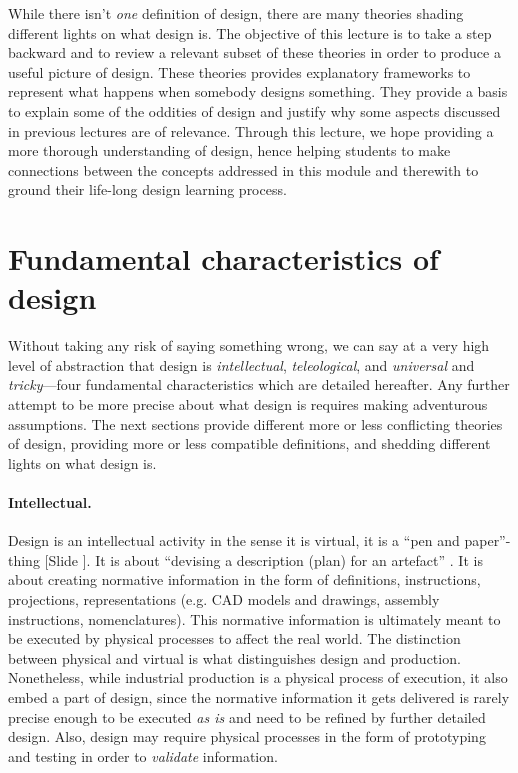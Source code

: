 \documentclass{article}
\newcounter{slide}
\begin{document}
While there isn't \emph{one} definition of design, there are many theories shading different lights on what design is. The objective of this lecture is to take a step backward and to review a relevant subset of these theories in order to produce a useful picture of design. These theories provides explanatory frameworks to represent what happens when somebody designs something. They provide a basis to explain some of the oddities of design and justify why some aspects discussed in previous lectures are of relevance. Through this lecture, we hope providing a more thorough understanding of design, hence helping students to make connections between the concepts addressed in this module and therewith to ground their life-long design learning process.

\section{Fundamental characteristics of design}
\label{sec:whatisdesign}

Without taking any risk of saying something wrong, we can say at a very high level of abstraction that design is \emph{intellectual}, \emph{teleological}, and \emph{universal} and \emph{tricky}---four fundamental characteristics which are detailed hereafter. Any further attempt to be more precise about what design is requires making adventurous assumptions. The next sections provide different more or less conflicting theories of design, providing more or less compatible definitions, and shedding different lights on what design is. 

\paragraph{Intellectual.} Design is an intellectual activity in the sense it is virtual, it is a ``pen and paper''-thing {\color{blue}[Slide ]}. It is about ``devising a description (plan) for an artefact'' \cite{hybsEvolutionaryProcessModel1992}. It is about creating normative information in the form of definitions, instructions, projections, representations (e.g. CAD models and drawings, assembly instructions, nomenclatures). This normative information is ultimately meant to be executed by physical processes to affect the real world. The distinction between physical and virtual is what distinguishes design and production. Nonetheless, while industrial production is a physical process of execution, it also embed a part of design, since the normative information it gets delivered is rarely precise enough to be executed \emph{as is} and need to be refined by further detailed design. Also, design may require physical processes in the form of prototyping and testing in order to \emph{validate} information.
\end{document}
